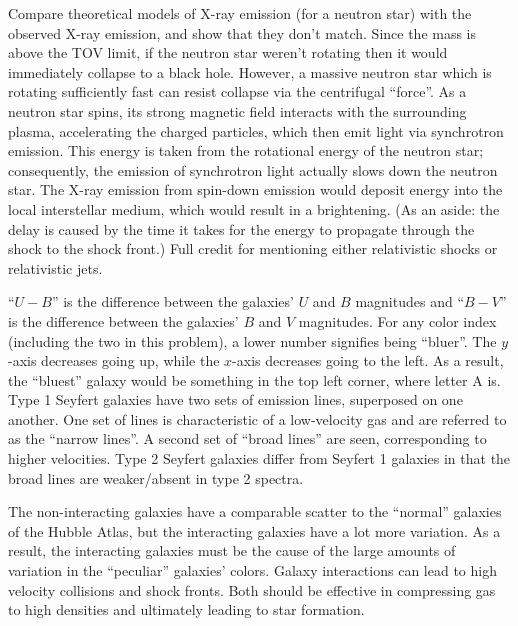 \documentclass{exam}
\begin{document}
	\begin{questions}
	\setcounter{question}{55}
	\question
		 Compare theoretical models of X-ray emission (for a neutron star) with the observed X-ray emission, and show that they don't match.
	\question
		 Since the mass is above the TOV limit, if the neutron star weren't rotating then it would immediately collapse to a black hole. However, a massive neutron star which is rotating sufficiently fast can resist collapse via the centrifugal ``force''.
	\question
		 As a neutron star spins, its strong magnetic field interacts with the surrounding plasma, accelerating the charged particles, which then emit light via synchrotron emission. This energy is taken from the rotational energy of the neutron star; consequently, the emission of synchrotron light actually slows down the neutron star.
	\question
		 The X-ray emission from spin-down emission would deposit energy into the local interstellar medium, which would result in a brightening. (As an aside: the delay is caused by the time it takes for the energy to propagate through the shock to the shock front.)
	\question
		 Full credit for mentioning either relativistic shocks or relativistic jets.
	\end{questions}
	\begin{questions}
	\setcounter{question}{60}
	\question
		 “$U-B$” is the difference between the galaxies’ $U$ and $B$ magnitudes and “$B-V$” is the difference between the galaxies’ $B$ and $V$ magnitudes.
	\question
		 For any color index (including the two in this problem), a lower number signifies being “bluer”. The $y$-axis decreases going up, while the $x$-axis decreases going to the left. As a result, the “bluest” galaxy would be something in the top left corner, where letter A is.
	\question
		 Type 1 Seyfert galaxies have two sets of emission lines, superposed on one another. One set of lines is characteristic of a low-velocity gas and are referred to as the “narrow lines”. A second set of “broad lines” are seen, corresponding to higher velocities. Type 2 Seyfert galaxies differ from Seyfert 1 galaxies in that the broad lines are weaker/absent in type 2 spectra.
	\end{questions}
	\begin{questions}
	\setcounter{question}{63}
	\question
		 The non-interacting galaxies have a comparable scatter to the “normal” galaxies of the Hubble Atlas, but the interacting galaxies have a lot more variation. As a result, the interacting galaxies must be the cause of the large amounts of variation in the “peculiar” galaxies’ colors.
	\question
		 Galaxy interactions can lead to high velocity collisions and shock fronts. Both should be effective in compressing gas to high densities and ultimately leading to star formation.
	\end{questions}
\end{document}
